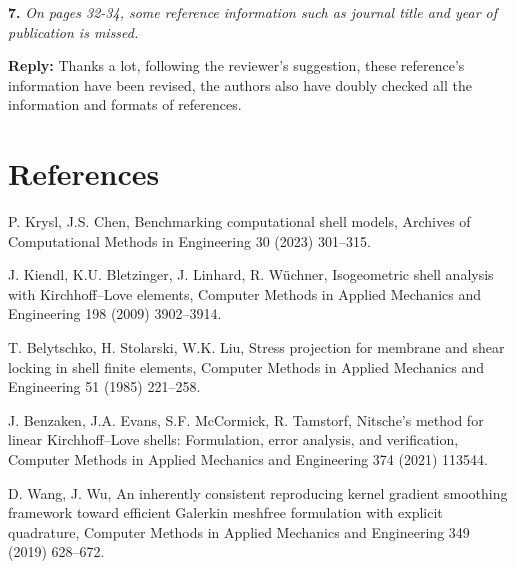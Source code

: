 \documentclass{article}
\begin{document}
\textbf{7.} \textit{On pages 32-34, some reference information such as journal title and year of publication is missed.}

\textbf{Reply:} Thanks a lot, following the reviewer's suggestion, these reference's information have been revised, the authors also have doubly checked all the information and formats of references.

\section*{References}
\begin{enumerate}[{[1]}]
    \item P. Krysl, J.S. Chen, Benchmarking computational shell models, Archives of Computational Methods in Engineering 30 (2023) 301–315. 
    \item J. Kiendl, K.U. Bletzinger, J. Linhard, R. Wüchner, Isogeometric shell analysis with Kirchhoff–Love elements, Computer Methods in Applied Mechanics and Engineering 198 (2009) 3902–3914. 
    \item T. Belytschko, H. Stolarski, W.K. Liu, Stress projection for membrane and shear locking in shell finite elements, Computer Methods in Applied Mechanics and Engineering 51 (1985) 221–258. 
    \item J. Benzaken, J.A. Evans, S.F. McCormick, R. Tamstorf, Nitsche’s method for linear Kirchhoff–Love shells: Formulation, error analysis, and verification, Computer Methods in Applied Mechanics and Engineering 374 (2021) 113544. 
    \item D. Wang, J. Wu, An inherently consistent reproducing kernel gradient smoothing framework toward efficient Galerkin meshfree formulation with explicit quadrature, Computer Methods in Applied Mechanics and Engineering 349 (2019) 628–672. 
\end{enumerate}
\end{document}
